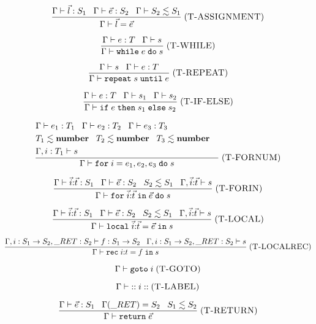 \documentclass[12pt]{article}
\newcommand{\Number}{\mathbf{number}}
\newcommand{\kw}[1]{\mathbf{\texttt{#1}}}
\newcommand{\mylabel}[1]{\; (\textsc{#1})}
\newcommand{\env}{\Gamma}
\newcommand{\ret}{\string_RET}
\begin{document}
\[
\frac{\env \vdash \vec{l}:S_{1} \;\;\;
      \env \vdash \vec{e}:S_{2} \;\;\;
      \env \vdash S_{2} \lesssim S_{1}}
     {\env \vdash \vec{l} = \vec{e}}
\mylabel{T-ASSIGNMENT}
\]

\[
\frac{\env \vdash e:T \;\;\;
      \env \vdash s}
     {\env \vdash \kw{while} \; e \; \kw{do} \; s}
\mylabel{T-WHILE}
\]

\[
\frac{\env \vdash s \;\;\;
      \env \vdash e:T}
     {\env \vdash \kw{repeat} \; s \; \kw{until} \; e}
\mylabel{T-REPEAT}
\]

\[
\frac{\env \vdash e:T \;\;\;
      \env \vdash s_{1} \;\;\;
      \env \vdash s_{2}}
     {\env \vdash \kw{if} \; e \; \kw{then} \; s_{1} \; \kw{else} \; s_{2}}
\mylabel{T-IF-ELSE}
\]

\[
\frac{\begin{aligned}
      & \env \vdash e_{1}:T_{1} \;\;\;
        \env \vdash e_{2}:T_{2} \;\;\;
        \env \vdash e_{3}:T_{3} & \\
      & T_{1} \lesssim \Number \;\;\;
        T_{2} \lesssim \Number \;\;\;
        T_{3} \lesssim \Number & \\
      & \env, i:T_{1} \vdash s &
      \end{aligned}}
     {\env \vdash \kw{for} \; i = e_{1},e_{2},e_{3} \; \kw{do} \; s}
\mylabel{T-FORNUM}
\]

\[
\frac{\env \vdash \vec{i}{:}\vec{t}:S_{1} \;\;\;
      \env \vdash \vec{e}:S_{2} \;\;\;
      S_{2} \lesssim S_{1} \;\;\;
      \env, \vec{i}{:}\vec{t} \vdash s}
     {\env \vdash \kw{for} \; \vec{i}{:}\vec{t} \; \kw{in} \; \vec{e} \; \kw{do} \; s}
\mylabel{T-FORIN}
\]

\[
\frac{\env \vdash \vec{i}{:}\vec{t}:S_{1} \;\;\;
      \env \vdash \vec{e}:S_{2} \;\;\;
      S_{2} \lesssim S_{1} \;\;\;
      \env, \vec{i}{:}\vec{t} \vdash s}
     {\env \vdash \kw{local} \; \vec{i}{:}\vec{t} = \vec{e} \; \kw{in} \; s}
\mylabel{T-LOCAL}
\]

\[
\frac{\env, i:S_{1} \rightarrow S_{2}, \ret:S_{2} \vdash f:S_{1} \rightarrow S_{2} \;\;\;
      \env, i:S_{1} \rightarrow S_{2}, \ret:S_{2} \vdash s}
     {\env \vdash \kw{rec} \; i{:}t = f \; \kw{in} \; s}
\mylabel{T-LOCALREC}
\]

\[
\env \vdash \kw{goto} \; i
\mylabel{T-GOTO}
\]

\[
\env \vdash {::} \; i \; {::}
\mylabel{T-LABEL}
\]

\[
\frac{\env \vdash \vec{e}:S_{1} \;\;\;
      \env(\ret) = S_{2} \;\;\;
      S_{1} \lesssim S_{2}}
     {\env \vdash \kw{return} \; \vec{e}}
\mylabel{T-RETURN}
\]
\end{document}
